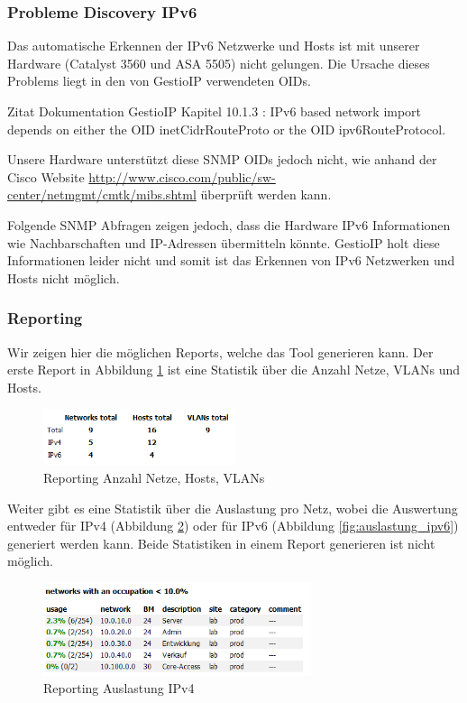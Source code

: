 \documentclass[11pt,a4paper,parskip=half]{scrartcl}
\begin{document}
\subsubsection{Probleme Discovery IPv6}
Das automatische Erkennen der IPv6 Netzwerke und Hosts ist mit unserer Hardware (Catalyst 3560 und ASA 5505) nicht gelungen. Die Ursache dieses Problems liegt in den von GestioIP verwendeten OIDs.

Zitat Dokumentation GestioIP Kapitel 10.1.3 : \glqq{}IPv6 based network import depends on either the OID inetCidrRouteProto or the OID ipv6RouteProtocol.\grqq{}

Unsere Hardware unterstützt diese SNMP OIDs jedoch nicht, wie anhand der Cisco Website \url{http://www.cisco.com/public/sw-center/netmgmt/cmtk/mibs.shtml} überprüft werden kann.

Folgende SNMP Abfragen zeigen jedoch, dass die Hardware IPv6 Informationen wie Nachbarschaften und IP-Adressen übermitteln könnte. GestioIP holt diese Informationen leider nicht und somit ist  das Erkennen von IPv6 Netzwerken und Hosts nicht möglich.



\subsubsection{Reporting}
Wir zeigen hier die möglichen Reports, welche das Tool generieren kann. Der erste Report in Abbildung \ref{fig:anzahlhosts} ist eine Statistik über die Anzahl Netze, VLANs und Hosts.
\begin{figure}[H]
\centering
\includegraphics[width=0.5\textwidth]{Phase3/Report_Anzahl_Netze_Hosts.PNG}
\caption{Reporting Anzahl Netze, Hosts, VLANs}
\label{fig:anzahlhosts}
\end{figure}

Weiter gibt es eine Statistik über die Auslastung pro Netz, wobei die Auswertung entweder für IPv4 (Abbildung \ref{fig:auslastung_ipv4}) oder für IPv6 (Abbildung \ref{fig:auslastung_ipv6}) generiert werden kann. Beide Statistiken in einem Report generieren ist nicht möglich.
\begin{figure}[H]
\centering
\includegraphics[width=0.7\textwidth]{Phase3/Report_Netz_Auslastung_IPv4.PNG}
\caption{Reporting Auslastung IPv4}
\label{fig:auslastung_ipv4}
\end{figure}
\end{document}
